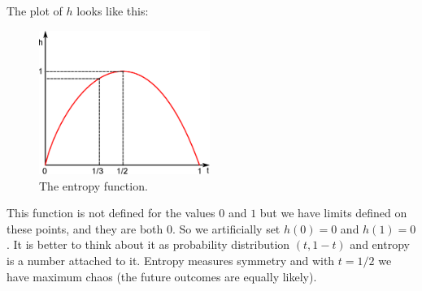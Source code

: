The plot of $h$ looks like this:
\begin{figure}[h]
	\centering
	\includegraphics[width=210px]{pictures/ch01-i00.eps}
	\caption{The entropy function.}
\end{figure}

This function is not defined for the values $0$ and $1$ but we have limits defined on these points, and they are both $0$. So we artificially set $h(0) = 0$ and $h(1) = 0$. It is better to think about it as probability distribution $(t, 1 - t)$ and entropy is a number attached to it. Entropy measures symmetry and with $t = 1/2$ we have maximum chaos (the future outcomes are equally likely).